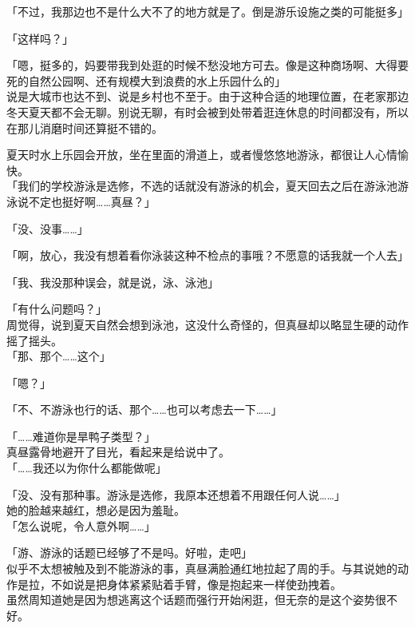 「不过，我那边也不是什么大不了的地方就是了。倒是游乐设施之类的可能挺多」

「这样吗？」

「嗯，挺多的，妈要带我到处逛的时候不愁没地方可去。像是这种商场啊、大得要死的自然公园啊、还有规模大到浪费的水上乐园什么的」\\

说是大城市也达不到、说是乡村也不至于。由于这种合适的地理位置，在老家那边冬天夏天都不会无聊。别说无聊，有时会被到处带着逛连休息的时间都没有，所以在那儿消磨时间还算挺不错的。

夏天时水上乐园会开放，坐在里面的滑道上，或者慢悠悠地游泳，都很让人心情愉快。\\

「我们的学校游泳是选修，不选的话就没有游泳的机会，夏天回去之后在游泳池游泳说不定也挺好啊……真昼？」

「没、没事……」

「啊，放心，我没有想着看你泳装这种不检点的事哦？不愿意的话我就一个人去」

「我、我没那种误会，就是说，泳、泳池」

「有什么问题吗？」\\

周觉得，说到夏天自然会想到泳池，这没什么奇怪的，但真昼却以略显生硬的动作摇了摇头。\\

「那、那个……这个」

「嗯？」

「不、不游泳也行的话、那个……也可以考虑去一下……」

「……难道你是旱鸭子类型？」\\

真昼露骨地避开了目光，看起来是给说中了。\\

「……我还以为你什么都能做呢」

「没、没有那种事。游泳是选修，我原本还想着不用跟任何人说……」\\

她的脸越来越红，想必是因为羞耻。\\

「怎么说呢，令人意外啊……」

「游、游泳的话题已经够了不是吗。好啦，走吧」\\

似乎不太想被触及到不能游泳的事，真昼满脸通红地拉起了周的手。与其说她的动作是拉，不如说是把身体紧紧贴着手臂，像是抱起来一样使劲拽着。\\

虽然周知道她是因为想逃离这个话题而强行开始闲逛，但无奈的是这个姿势很不好。\\

